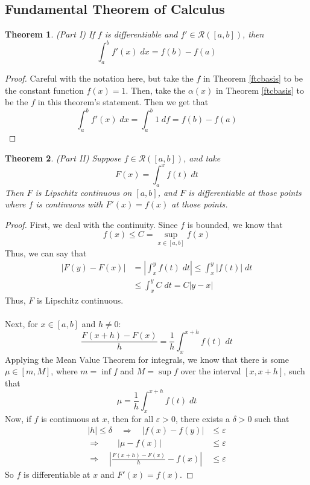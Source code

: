 \documentclass[12pt]{article}
\theoremstyle{plain}
\newtheorem{thm}{Theorem}[subsection]
\theoremstyle{definition}
\theoremstyle{remark}
\begin{document}
\newpage
\subsection{Fundamental Theorem of Calculus}

\begin{thm} \emph{(Part I)}
\label{ftc1}
If $f$ is differentiable and $f'\in\mathscr{R}([a,b])$, then 
    \[ \int^b_a f'(x)\;dx = f(b) - f(a) \]
\end{thm}
\begin{proof}
Careful with the notation here, but take the $f$ in Theorem \ref{ftcbasis} to be the constant function $f(x) =1$. Then, take the $\alpha(x)$ in Theorem \ref{ftcbasis} to be the $f$ in this theorem's statement. Then we get that
\[ \int^b_a f'(x) \;dx = \int^b_a 1 \;df = f(b) - f(a) \]
\end{proof}

\begin{thm} \emph{(Part II)}
\label{ftc2}
Suppose $f\in\mathscr{R}([a,b])$, and take 
    \[ F(x) = \int^x_a f(t)\;dt \]
Then $F$ is Lipschitz continuous on $[a,b]$, and $F$ is differentiable at those points where $f$ is continuous with $F'(x) = f(x)$ at those points.
\end{thm}
\begin{proof}
First, we deal with the continuity. Since $f$ is bounded, we know that 
    \[ 
        f(x) \leq C = \sup_{x\in[a,b]} f(x)
    \]
Thus, we can say that
\begin{align*}
    |F(y) - F(x)| &= \left\lvert \int^y_x f(t)\;dt \right\rvert
        \leq \int^y_x |f(t)|\;dt \\
    &\leq \int^y_x C\;dt = C|y-x| 
\end{align*}
Thus, $F$ is Lipschitz continuous.
\\
\\
Next, for $x\in[a,b]$ and $h\neq 0$:
\[ 
    \frac{F(x+h)-F(x)}{h} = \frac{1}{h}\int^{x+h}_x f(t)\;dt
\]
Applying the Mean Value Theorem for integrals, we know that there is some $\mu \in [m, M]$, where $m = \inf f$ and $M = \sup f$ over the interval $[x,x+h]$, such that 
    \[ \mu = \frac{1}{h}\int^{x+h}_x f(t)\;dt \]
Now, if $f$ is continuous at $x$, then for all $\varepsilon>0$, there exists a $\delta>0$ such that 
\begin{align*}
    |h| \leq \delta \quad \Rightarrow \quad |f(x) - f(y)|
        &\leq\varepsilon \\
    \Rightarrow \qquad |\mu - f(x)|&\leq\varepsilon \\
    \Rightarrow \quad \left\lvert \frac{F(x+h)-F(x)}{h}- f(x)
        \right\rvert
        &\leq\varepsilon 
\end{align*}
So $f$ is differentiable at $x$ and $F'(x)=f(x)$.
\end{proof}
\end{document}

